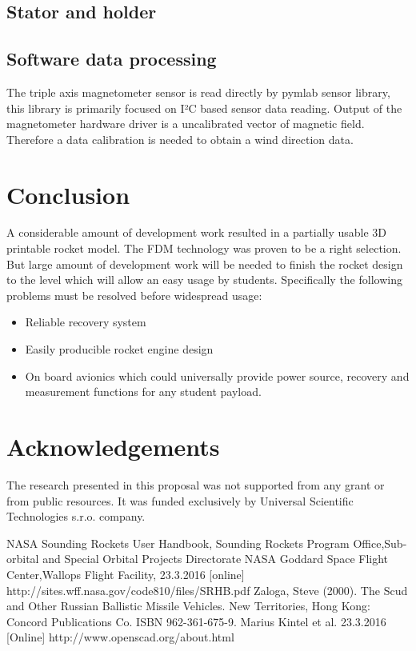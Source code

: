 \documentclass{poster16}
\begin{document}
\subsection{Stator and holder}




\subsection{Software data processing}

The triple axis magnetometer sensor is read directly by pymlab sensor library, this library is primarily focused on I²C based sensor data reading.
Output of the magnetometer hardware driver is a uncalibrated vector of magnetic field.  Therefore a data calibration is needed to obtain a wind direction data. 



\section{Conclusion}

A considerable amount of development work resulted in a partially usable 3D printable rocket model. The FDM technology was proven to be a right selection. But large amount of development work will be needed to finish the rocket design to the level which will allow an easy usage by students. 
Specifically the following problems must be resolved before widespread usage: 

\begin{itemize}
\item Reliable recovery system
\item Easily producible rocket engine design  
\item On board avionics which could universally provide power source, recovery and measurement functions for any student payload. 
\end{itemize}

\section*{Acknowledgements}

The research presented in this proposal was not supported from any grant or from public resources. It was funded exclusively by Universal Scientific Technologies s.r.o. company. 

\begin{thebibliography}{9}
NASA Sounding Rockets User Handbook, Sounding Rockets Program Office,Sub-orbital and Special Orbital Projects Directorate
NASA Goddard Space Flight Center,Wallops Flight Facility, 23.3.2016 [online] http://sites.wff.nasa.gov/code810/files/SRHB.pdf
Zaloga, Steve (2000). The Scud and Other Russian Ballistic Missile Vehicles. New Territories, Hong Kong: Concord Publications Co. ISBN 962-361-675-9.
Marius Kintel et al.  23.3.2016 [Online]
http://www.openscad.org/about.html
\end{thebibliography}
\end{document}
